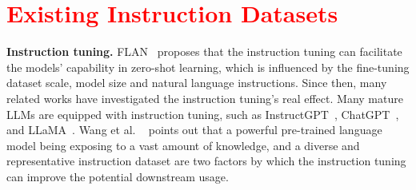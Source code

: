 \section{\textcolor{red}{Existing Instruction Datasets}}


\textbf{Instruction tuning.}
FLAN~\citep{wei2021flan} proposes that the instruction tuning can facilitate the models' capability in zero-shot learning, which is influenced by the fine-tuning dataset scale, model size and natural language instructions. Since then, many related works have investigated the instruction tuning's real effect. Many mature LLMs are equipped with instruction tuning, such as InstructGPT~\citep{ouyang2022traininglanguagemodelsfollow}, ChatGPT~\citep{achiam2023gpt}, and LLaMA~\citep{touvron2023llama}. Wang et al. ~\citep{wang2023far} points out that a powerful pre-trained language model being exposing to a vast amount of knowledge, and a diverse and representative instruction dataset are two factors by which the instruction tuning can improve the potential downstream usage.  %


